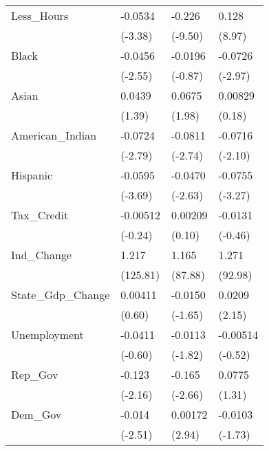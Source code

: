\begin{longtable}{p{3 cm} p{2.25 cm} p{2.25 cm} p{2.25 cm}}
Less\_Hours  &     -0.0534\sym{***}&      -0.226\sym{***}&       0.128\sym{***}\\
            &     (-3.38)         &     (-9.50)         &      (8.97)         \\
Black      &     -0.0456\sym{*}  &     -0.0196         &     -0.0726\sym{**} \\
            &     (-2.55)         &     (-0.87)         &     (-2.97)         \\
Asian      &      0.0439         &      0.0675\sym{*}  &     0.00829         \\
            &      (1.39)         &      (1.98)         &      (0.18)         \\
American\_Indian      &     -0.0724\sym{**} &     -0.0811\sym{**} &     -0.0716\sym{*}  \\
            &     (-2.79)         &     (-2.74)         &     (-2.10)         \\
Hispanic        &     -0.0595\sym{***}&     -0.0470\sym{**} &     -0.0755\sym{**} \\
            &     (-3.69)         &     (-2.63)         &     (-3.27)         \\
Tax\_Credit  &    -0.00512         &     0.00209\sym{*}        &     -0.0131         \\
            &     (-0.24)         &      (0.10)         &     (-0.46)         \\
Ind\_Change  &       1.217\sym{***}&       1.165\sym{***}&       1.271\sym{***}\\
            &    (125.81)         &     (87.88)         &     (92.98)         \\
State\_Gdp\_Change&     0.00411         &     -0.0150         &      0.0209\sym{*}  \\
            &      (0.60)         &     (-1.65)         &      (2.15)         \\
Unemployment &     -0.0411         &     -0.0113\sym{*}        &      -0.00514\sym{*}  \\
            &      (-0.60)         &     (-1.82)         &      (-0.52)         \\            
Rep\_Gov     &      -0.123\sym{*}  &      -0.165\sym{**} &     0.0775         \\
            &     (-2.16)         &     (-2.66)         &     (1.31)         \\
Dem\_Gov     &      -0.014\sym{*}  &      0.00172\sym{**} &      -0.0103         \\
            &     (-2.51)         &     (2.94)         &     (-1.73)         \\

\end{longtable}
